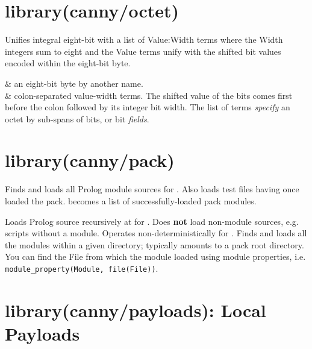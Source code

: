 \chapter{library(canny/octet)}\label{sec:octet}

\begin{description}
Unifies integral eight-bit  with a list of Value:Width terms
where the Width integers sum to eight and the Value terms unify with
the shifted bit values encoded within the eight-bit byte.

\begin{arguments}
 & an eight-bit byte by another name. \\
 & colon-separated value-width terms. The shifted value of
the bits comes first before the colon followed by its integer bit
width. The list of terms \textit{specify} an octet by sub-spans of bits, or
bit \textit{fields}. \\
\end{arguments}
\end{description}

\chapter{library(canny/pack)}\label{sec:pack}

\begin{description}
Finds and loads all Prolog module sources for . Also loads test
files having once loaded the pack.  becomes a list of
successfully-loaded pack modules.

Loads Prolog source recursively at  for . Does \textbf{not}
load non-module sources, e.g. scripts without a module. Operates
non-deterministically for . Finds and loads all the modules
within a given directory; typically amounts to a pack root
directory. You can find the File from which the module loaded using
module properties, i.e. \verb$module_property(Module, file(File))$.
\end{description}

\chapter{library(canny/payloads): Local Payloads}\label{sec:payloads}

